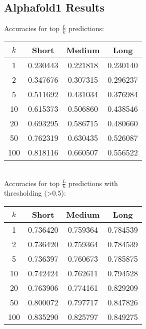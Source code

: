 \documentclass[11pt]{article}
\begin{document}
\begin{minipage}{0.45\textwidth}
\subsection{Alphafold1 Results}
Accuracies for top $\frac{L}{k}$ predictions:\\[4mm]
\begin{tabular}{c||c|c|c}
$k$ & Short & Medium & Long\\
\hline
1   & 0.230443 & 0.221818 & 0.230140\\
2   & 0.347676 & 0.307315 & 0.296237\\
5   & 0.511692 & 0.431034 & 0.376984\\
10  & 0.615373 & 0.506860 & 0.438546\\
20  & 0.693295 & 0.586715 & 0.480660\\
50  & 0.762319 & 0.630435 & 0.526087\\
100 & 0.818116 & 0.660507 & 0.556522
\end{tabular}\\[6mm]

Accuracies for top $\frac{L}{k}$ predictions with\\thresholding (>0.5):\\[4mm]
\begin{tabular}{c||c|c|c}
$k$ & Short & Medium & Long\\
\hline
1   & 0.736420 & 0.759364 & 0.784539\\
2   & 0.736420 & 0.759364 & 0.784539\\
5   & 0.736397 & 0.760673 & 0.785875\\
10  & 0.742424 & 0.762611 & 0.794528\\
20  & 0.763906 & 0.774161 & 0.829209\\
50  & 0.800072 & 0.797717 & 0.847826\\
100 & 0.835290 & 0.825797 & 0.849275
\end{tabular}
\end{minipage}
\hfill
\end{document}
